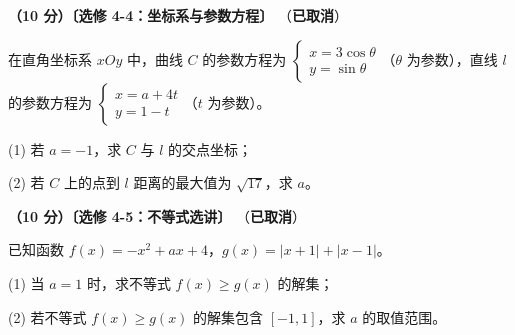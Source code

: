 \textbf{（10 分）〔选修 4-4：坐标系与参数方程〕} （\textbf{已取消}）

在直角坐标系 $xOy$ 中，曲线 $C$ 的参数方程为 $\begin{cases}x=3\cos\theta\\ y=\sin\theta\end{cases}$（$\theta$ 为参数），直线 $l$ 的参数方程为 $\begin{cases}x=a+4t\\ y=1-t\end{cases}$（$t$ 为参数）。

  (1) 若 $a=-1$，求 $C$ 与 $l$ 的交点坐标；

  (2) 若 $C$ 上的点到 $l$ 距离的最大值为 $\sqrt{17}$，求 $a$。

\textbf{（10 分）〔选修 4-5：不等式选讲〕} （\textbf{已取消}）

已知函数 $f(x)=-x^{2}+ax+4$，$g(x)=|x+1|+|x-1|$。

  (1) 当 $a=1$ 时，求不等式 $f(x)\ge g(x)$ 的解集；

  (2) 若不等式 $f(x)\ge g(x)$ 的解集包含 $[-1,1]$，求 $a$ 的取值范围。

\par\medskip

